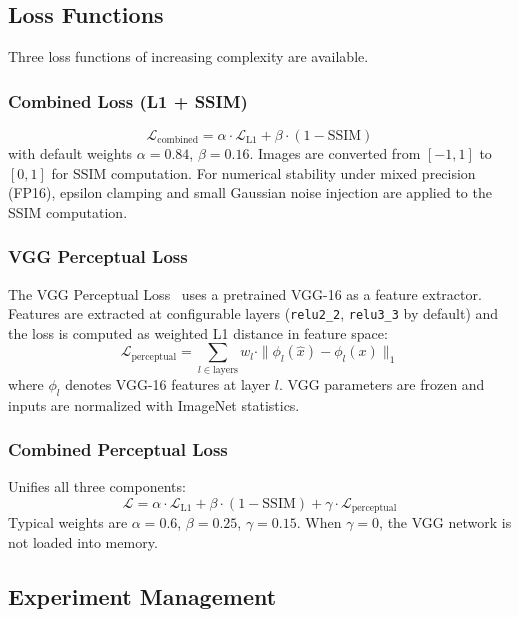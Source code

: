 \subsection{Loss Functions}

Three loss functions of increasing complexity are available.

\subsubsection{Combined Loss (L1 + SSIM)}
\begin{equation}
\mathcal{L}_{\text{combined}} = \alpha \cdot \mathcal{L}_{\text{L1}} + \beta \cdot (1 - \text{SSIM})
\label{eq:combined_loss}
\end{equation}
with default weights $\alpha = 0.84$, $\beta = 0.16$. Images are converted from $[-1,1]$ to $[0,1]$ for SSIM computation. For numerical stability under mixed precision (FP16), epsilon clamping and small Gaussian noise injection are applied to the SSIM computation.

\subsubsection{VGG Perceptual Loss}
The VGG Perceptual Loss~\cite{perceptualloss} uses a pretrained VGG-16 as a feature extractor. Features are extracted at configurable layers (\texttt{relu2\_2}, \texttt{relu3\_3} by default) and the loss is computed as weighted L1 distance in feature space:
\begin{equation}
\mathcal{L}_{\text{perceptual}} = \sum_{l \in \text{layers}} w_l \cdot \|\phi_l(\hat{x}) - \phi_l(x)\|_1
\end{equation}
where $\phi_l$ denotes VGG-16 features at layer $l$. VGG parameters are frozen and inputs are normalized with ImageNet statistics.

\subsubsection{Combined Perceptual Loss}
Unifies all three components:
\begin{equation}
\mathcal{L} = \alpha \cdot \mathcal{L}_{\text{L1}} + \beta \cdot (1 - \text{SSIM}) + \gamma \cdot \mathcal{L}_{\text{perceptual}}
\label{eq:perceptual_loss}
\end{equation}
Typical weights are $\alpha = 0.6$, $\beta = 0.25$, $\gamma = 0.15$. When $\gamma = 0$, the VGG network is not loaded into memory.

\subsection{Experiment Management}

